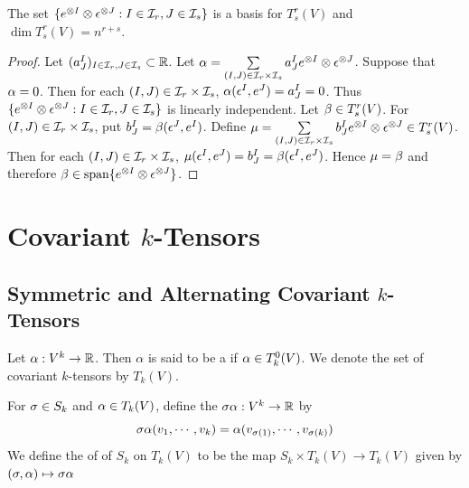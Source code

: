 \documentclass{book}
\begin{document}
	\begin{ex}
		The set $\{e^{\otimes I} \otimes \epsilon^{\otimes J}: I \in \mathcal{I}_r, J \in \mathcal{I}_s\}$ is a basis for $T^r_s(V)$ and $\dim T^r_s(V) = {n^{r+s}}$.
	\end{ex}

	\begin{proof}
		Let $(a^I_J)_{I \in \mathcal{I}_r, J \in \mathcal{I}_s} \subset \mathbb{R}$. Let $\alpha = \sum\limits_{(I,J) \in \mathcal{I}_r \times \mathcal{I}_s} a^I_J e^{\otimes I} \otimes  \epsilon^{\otimes J}$. 
		Suppose that $\alpha = 0$. Then for each $(I,J) \in \mathcal{I}_r \times \mathcal{I}_s$, $\alpha(\epsilon^I, e^J) = a^I_J = 0$. Thus $\{e^{\otimes I} \otimes \epsilon^{\otimes J}: I \in \mathcal{I}_r, J \in \mathcal{I}_s\}$ is linearly independent. Let $\beta \in T^r_s(V)$. For $(I,J) \in \mathcal{I}_r \times \mathcal{I}_s$, put $b^I_J = \beta(\epsilon^J, e^I)$. Define $\mu = \sum\limits_{(I,J) \in \mathcal{I}_r \times \mathcal{I}_s} b^I_J e^{\otimes I} \otimes \epsilon^{\otimes J} \in T^r_s(V)$. Then for each $(I,J) \in \mathcal{I}_r \times \mathcal{I}_s$, $\mu(\epsilon^I, e^J) = b^I_J = \beta(\epsilon^I, e^J)$. Hence $\mu = \beta$ and therefore $\beta \in \operatorname{span} \{e^{\otimes I} \otimes \epsilon^{\otimes J} \}$.
	\end{proof}		
		
		
		
		
	
	
	
	
	
	
	\newpage
	\section{Covariant $k$-Tensors}	
	
	\subsection{Symmetric and Alternating Covariant $k$-Tensors}
	
	\begin{defn}
		Let $\alpha: V^k \rightarrow \mathbb{R}$. Then $\alpha$ is said to be a  if $\alpha \in T^0_k(V)$. We denote the set of covariant $k$-tensors by $T_k(V)$.
	\end{defn}

	\begin{defn}
		For $\sigma \in S_k$ and $\alpha \in T_k(V)$, define the $\sigma \alpha : V^k \rightarrow \mathbb{R}$ by $$\sigma \alpha(v_1, \cdots, v_k) = \alpha(v_{\sigma(1)}, \cdots, v_{\sigma(k)})$$  
		We define the  of of $S_k$ on $T_k(V)$ to be the map $S_k \times T_k(V) \rightarrow T_k(V)$ given by $(\sigma, \alpha) \mapsto \sigma \alpha$
	\end{defn}
\end{document}
